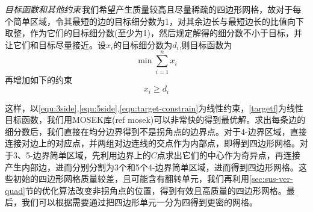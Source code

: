 \emph{目标函数和其他约束}\,我们希望产生质量较高且尽量稀疏的四边形网格，故对于每个简单区域，令其最短的边的目标细分数为1，对其余边长与最短边长的比值向下取整，作为它们的目标细分数(至少为1)，然后规定解得的细分数不小于目标，并让它们和目标尽量接近。设$x_i$的目标细分数为$d_i$,则目标函数为
\begin{equation}\label{equ:targetf}
\min \sum_{i=1}^{n} x_i
\end{equation}
再增加如下的约束
\begin{equation} \label{equ:target-constrain}
x_i \geq d_i
\end{equation}

这样，以\ref{equ:3side},\ref{equ:5side},\ref{equ:target-constrain}为线性约束，\ref{targetf}为线性目标函数，我们用MOSEK库(ref mosek)可以非常快的得到最优解。求出每条边的细分数后，我们直接在均分边界得到不是拐角点的边界点。对于4-边界区域，直接连接对边上的对应点，并两组对边连线的交点作为内部点，即得到四边形网格。对于3、5-边界简单区域，先利用边界上的$C$点求出它们的中心作为奇异点，再连接产生内部边，进而分别分割为3个和5个4-边界简单区域，进而得到四边形网格。这些初始的四边形网格质量较差，且可能含有翻转单元，我们再利用\ref{sec:sus-ver-quad}节的优化算法改变非拐角点的位置，得到有效且高质量的四边形网格。最后，我们可以根据需要通过把四边形单元一分为四得到更密的网格。
